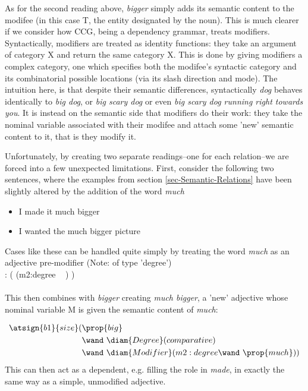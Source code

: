 As for the second reading above, \emph{bigger} simply adds its semantic content to the modifee (in this case T, the entity designated by the noun). This is much clearer if we consider how \textsc{CCG}, being a dependency grammar, treats modifiers. Syntactically, modifiers are treated  as identity functions: they take an argument of category X and return the same category X. This is done by giving modifiers a complex category, one which specifies both the modifee's syntactic category and its combinatorial possible locations (via its slash direction and mode). The intuition here, is that despite their semantic differences, syntactically \emph{dog} behaves identically to \emph{big dog},  or \emph{big scary dog} or even \emph{big scary dog running right towards you}.  It is instead on the semantic side that modifiers do their work: they take the nominal variable associated with their modifee and attach some 'new' semantic content to it, that is they modify it. 

Unfortunately, by creating two separate readings--one for each relation--we are forced into a few unexpected limitations. First, consider the following two sentences, where the examples from section \ref{sec-Semantic-Relations} have been slightly altered by the addition of the word \emph{much}
\begin{itemize}
\item	 I made it much bigger
\item	 I wanted the much bigger picture
\end{itemize}
Cases like these can be handled quite simply by treating the word \emph{much} as an adjective pre-modifier (Note: of type 'degree')\\

  : (  (m2:degree \wand\    ) ) \\\\
This then combines with \emph{bigger} creating \emph{much bigger}, a 'new' adjective whose nominal variable M is given the semantic content of \emph{much}:

\vspace{-1.5em} %
\begin{align*}
\atsign{b1}{size}(& \prop{big}  \\ 
      & \wand\ \diam{Degree}(comparative) \\
      & \wand\ \diam{Modifier}(m2:degree \wand\  \prop{much} )) 
\end{align*} 
This can then act as a dependent, e.g. filling the  role in \emph{made}, in exactly the same way as a simple, unmodified adjective.

